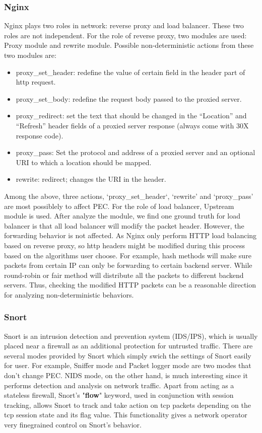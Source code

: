 \subsubsection{Nginx}
Nginx plays two roles in network: reverse proxy and load balancer.
These two roles are not independent.
For the role of reverse proxy, two modules are used: \ca Proxy module and \cb rewrite module.
Possible non-deterministic actions from these two modules are:
\begin{itemize}
	\item proxy\_set\_header: redefine the value of certain field in the header part of http request.
	\item proxy\_set\_body: redefine the request body passed to the proxied server.
	\item proxy\_redirect: set the text that should be changed in the “Location” and “Refresh” header fields of a proxied server response (always come with 30X response code).
	\item proxy\_pass: Set the protocol and address of a proxied server and an optional URI to which a location should be mapped.
	\item rewrite: redirect; changes the URI in the header.
\end{itemize}
Among the above, three actions, ‘proxy\_set\_header‘, ‘rewrite’ and ‘proxy\_pass’ are most possiblely to affect PEC.
For the role of load balancer, Upstream module is used.
After analyze the module, we find one ground truth for load balancer is that all load balancer will modify the packet header.
However, the forwarding behavior is not affected.
As Nginx only perform HTTP load balancing based on reverse proxy, so http headers might be modified during this process based on the algorithms user choose.
For example, hash methods will make sure packets from certain IP can only be forwarding to certain backend server.
While round-robin or fair method will distribute all the packets to different backend servers.
Thus, checking the modified HTTP packets can be a reasonable direction for analyzing non-deterministic behaviors.

\subsubsection{Snort}
Snort is an intrusion detection and prevention system (IDS/IPS), which is usually placed near a firewall as an additional protection for untrusted traffic.
There are several modes provided by Snort which simply swich the settings of Snort easily for user.
For example, Sniffer mode and Packet logger mode are two modes that don’t change PEC.
NIDS mode, on the other hand, is much interesting since it performs detection and analysis on network traffic.
Apart from acting as a stateless firewall, Snort’s "\textbf{flow}" keyword, used in conjunction with session tracking, allows Snort to track and take action on tcp packets depending on the tcp session state and its flag value.
This functionality gives a network operator very finegrained control on Snort’s behavior.

